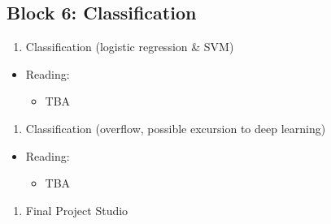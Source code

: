 \documentclass[]{book}
\providecommand{\tightlist}{%
  \setlength{\itemsep}{0pt}\setlength{\parskip}{0pt}}
\begin{document}
\hypertarget{block-6-classification}{%
\subsection{Block 6: Classification}\label{block-6-classification}}

\begin{enumerate}
\def\labelenumi{\arabic{enumi}.}
\setcounter{enumi}{11}
\tightlist
\item
  Classification (logistic regression \& SVM)
\end{enumerate}

\begin{itemize}
\tightlist
\item
  Reading:

  \begin{itemize}
  \tightlist
  \item
    TBA
  \end{itemize}
\end{itemize}

\begin{enumerate}
\def\labelenumi{\arabic{enumi}.}
\setcounter{enumi}{12}
\tightlist
\item
  Classification (overflow, possible excursion to deep learning)
\end{enumerate}

\begin{itemize}
\tightlist
\item
  Reading:

  \begin{itemize}
  \tightlist
  \item
    TBA
  \end{itemize}
\end{itemize}

\begin{enumerate}
\def\labelenumi{\arabic{enumi}.}
\setcounter{enumi}{13}
\tightlist
\item
  Final Project Studio
\end{enumerate}


\end{document}
